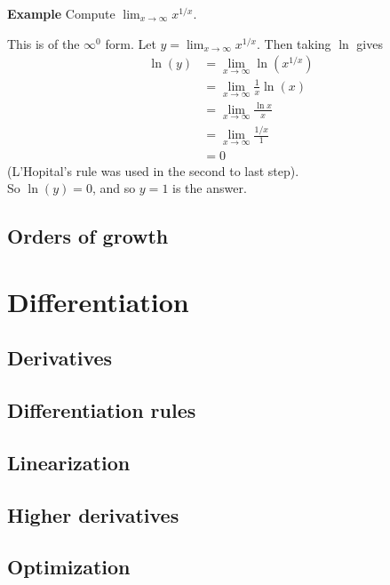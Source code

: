 \documentclass[a4paper]{book}
\begin{document}
\begin{sloppypar}
\textbf{Example} Compute $\displaystyle \lim_{x \rightarrow \infty} x^{1/x}$. 
\begin{examplebox}
This is of the $\infty^0$ form. Let $\displaystyle y = \lim_{x \rightarrow \infty} x^{1/x}$. Then taking $\ln$ gives
\begin{align*}
\ln(y) &= \lim_{x \rightarrow \infty} \ln\left(x^{1/x}\right) \\
&= \lim_{x \rightarrow \infty} \frac{1}{x}\ln(x) \\
&= \lim_{x \rightarrow \infty} \frac{\ln x}{x} \\
&= \lim_{x \rightarrow \infty} \frac{1/x}{1} \\
&= 0 
\end{align*}
(L'Hopital's rule was used in the second to last step).\\
So $\ln(y) = 0$, and so $y = 1$ is the answer.
\end{examplebox}

\section{Orders of growth} \label{ChFunctionsSecOrdersOfGrowth}

\chapter{Differentiation} \label{ChDifferentiation}
\section{Derivatives} \label{ChDifferentiationSecDerivatives}
\section{Differentiation rules} \label{ChDifferentiationSecDifferentiationRules}
\section{Linearization} \label{ChDifferentiationSecLinearization}
\section{Higher derivatives} \label{ChDifferentiationSecHigherDerivatives}
\section{Optimization} \label{ChDifferentiationSecOptimization}

\end{sloppypar}
\end{document}

